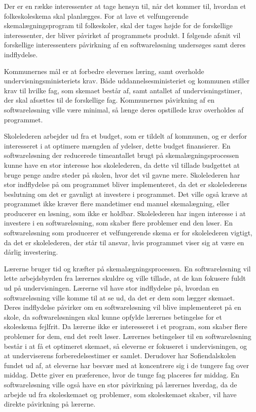 Der er en række interessenter at tage hensyn til, når det kommer til, hvordan et folkeskoleskema skal planlægges. For at lave et velfungerende skemalægningsprogram til folkeskoler, skal der tages højde for de forskellige interessenter, der bliver påvirket af programmets produkt. I følgende afsnit vil forskellige interessenters påvirkning af en softwareløsning undersøges samt deres indflydelse. 


Kommunernes mål er at forbedre elevernes læring, samt overholde undervisningsministeriets krav. Både uddannelsesministeriet og kommunen stiller krav til hvilke fag, som skemaet består af, samt antallet af undervisningstimer, der skal afsættes til de forskellige fag. Kommunernes påvirkning af en softwareløsning ville være minimal, så længe deres opstillede krav overholdes af programmet.


Skolelederen arbejder ud fra et budget, som er tildelt af kommunen, og er derfor interesseret i at optimere mængden af ydelser, dette budget finansierer. En softwareløsning der reducerede timeantallet brugt på skemalægningsprocessen kunne have en stor interesse hos skolelederen, da dette vil tillade budgettet at bruge penge andre steder på skolen, hvor det vil gavne mere. Skolelederen har stor indflydelse på om programmet bliver implementeret, da det er skolelederens beslutning om det er gavnligt at investere i programmet. Det ville også kræve at programmet ikke kræver flere mandetimer end manuel skemalægning, eller producerer en løsning, som ikke er holdbar. Skolelederen har ingen interesse i at investere i en softwareløsning, som skaber flere problemer end den løser. En softwareløsning som producerer et velfungerende skema er for skolelederen vigtigt, da det er skolelederen, der står til ansvar, hvis programmet viser sig at være en dårlig investering.


Lærerne bruger tid og kræfter på skemalægningsprocessen. En softwareløsning vil lette arbejdsbyrden fra lærernes skuldre og ville tillade, at de kan fokusere fuldt ud på undervisningen. Lærerne vil have stor indflydelse på, hvordan en softwareløsning ville komme til at se ud, da det er dem som lægger skemaet. Deres indflydelse påvirker om en softwareløsning vil blive implementeret på en skole, da softwareløsningen skal kunne opfylde lærernes betingelse for et skoleskema fejlfrit. Da lærerne ikke er interesseret i et program, som skaber flere problemer for dem, end det reelt løser. Lærernes betingelser til en softwareløsning består i at få et optimeret skemaet, så eleverne er fokuseret i undervisningen, og at underviserens forberedelsestimer er samlet. Derudover har Sofiendalskolen fundet ud af, at eleverne har besvær med at koncentrere sig i de tungere fag over middag. Dette giver en præference, hvor de tunge fag placeres før middag. En softwareløsning ville også have en stor påvirkning på lærernes hverdag, da de arbejde ud fra skoleskemaet og problemer, som skoleskemaet skaber, vil have direkte påvirkning på lærerne.


